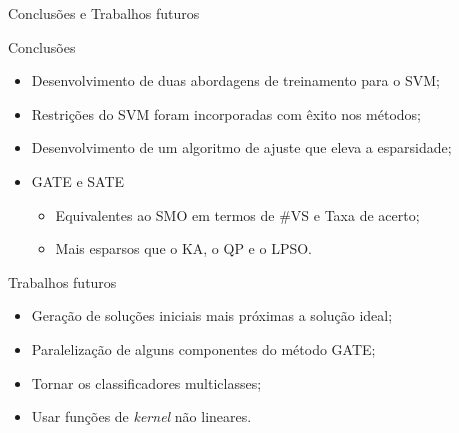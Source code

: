 \documentclass{beamer}
\begin{document}
\begin{frame}{Conclusões e Trabalhos futuros}
  \begin{block}{Conclusões}
    \begin{itemize}
      \item  Desenvolvimento de duas abordagens de treinamento para o SVM;
      \item  Restrições do SVM foram incorporadas com êxito nos métodos;
      \item  Desenvolvimento de um algoritmo de ajuste que eleva a esparsidade;
      \item  GATE e SATE
      \begin{itemize}
        \item Equivalentes ao SMO em termos de \#VS e Taxa de acerto;
        \item Mais esparsos que o KA, o QP e o LPSO.
      \end{itemize}
    \end{itemize}
  \end{block}
  \begin{block}{Trabalhos futuros}
    \begin{itemize}
      \item  Geração de soluções iniciais mais próximas a solução ideal;
      \item  Paralelização de alguns componentes do método GATE;
      \item  Tornar os classificadores multiclasses;
      \item  Usar funções de \textit{kernel} não lineares.
    \end{itemize}
  \end{block}
\end{frame}


\end{document}
